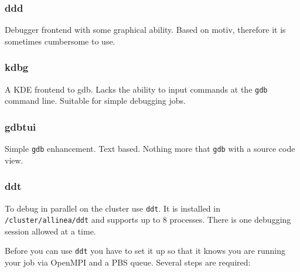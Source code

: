 \subsubsection{ddd}

Debugger frontend with some graphical ability. Based on motiv, therefore
it is sometimes cumbersome to use.


\subsubsection{kdbg}

A KDE frontend to gdb. Lacks the ability to input commands at the
\texttt{gdb} command line. Suitable for simple debugging jobs.


\subsubsection{gdbtui}

Simple \texttt{gdb} enhancement. Text based. Nothing more that \texttt{gdb}
with a source code view.


\subsubsection{ddt}

To debug in parallel on the cluster use \texttt{ddt}. It is installed
in \texttt{/cluster/allinea/ddt} and supports up to 8 processes. There
is one debugging session allowed at a time.

Before you can use \texttt{ddt} you have to set it up so that it knows
you are running your job via OpenMPI and a PBS queue. Several steps
are required:

